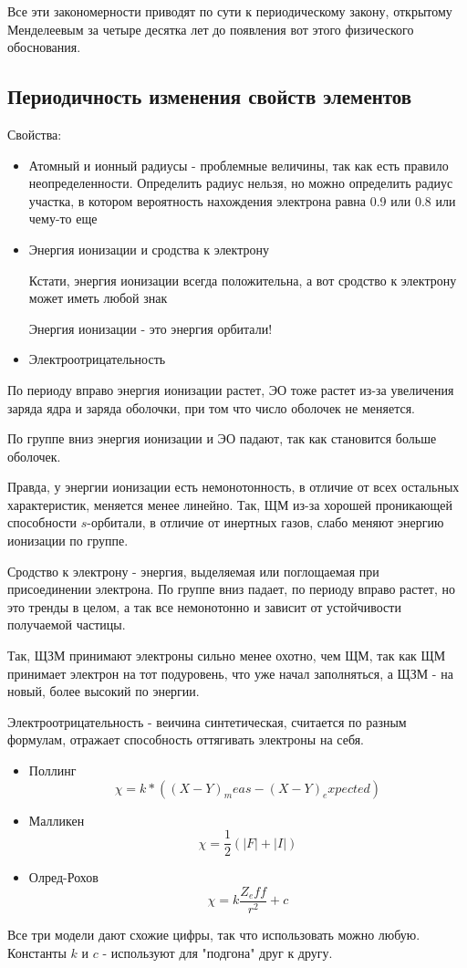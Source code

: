 \documentclass[11pt]{article}
\begin{document}
Все эти закономерности приводят по сути к периодическому закону, открытому Менделеевым за четыре десятка лет до появления вот этого физического обоснования.

\subsection*{Периодичность изменения свойств элементов}
Свойства:
\begin{itemize}
\item Атомный и ионный радиусы - проблемные величины, так как есть правило неопределенности. Определить радиус нельзя, но можно определить радиус участка, в котором вероятность нахождения электрона равна 0.9 или 0.8 или чему-то еще
\item Энергия ионизации и сродства к электрону

Кстати, энергия ионизации всегда положительна, а вот сродство к электрону может иметь любой знак

Энергия ионизации - это энергия орбитали!

\item Электроотрицательность
\end{itemize}

По периоду вправо энергия ионизации растет, ЭО тоже растет из-за увеличения заряда ядра и заряда оболочки, при том что число оболочек не меняется.

По группе вниз энергия ионизации и ЭО падают, так как становится больше оболочек. 

Правда, у энергии ионизации есть немонотонность, в отличие от всех остальных характеристик, меняется менее линейно. Так, ЩМ из-за хорошей проникающей способности $s$-орбитали, в отличие от инертных газов, слабо меняют энергию ионизации по группе.

Сродство к электрону - энергия, выделяемая или поглощаемая при присоединении электрона. По группе вниз падает, по периоду вправо растет, но это тренды в целом, а так все немонотонно и зависит от устойчивости получаемой частицы.

Так, ЩЗМ принимают электроны сильно менее охотно, чем ЩМ, так как ЩМ принимает электрон на тот подуровень, что уже начал заполняться, а ЩЗМ - на новый, более высокий по энергии.

Электроотрицательность - веичина синтетическая, считается по разным формулам, отражает способность оттягивать электроны на себя.
\begin{itemize}
\item Поллинг
$$\chi = k*(\left(X-Y\right)_meas - \left(X-Y\right)_expected)$$
\item Малликен
$$\chi = \frac 12 \left(|F| + |I|\right)$$
\item Олред-Рохов
$$\chi = k\frac{Z_eff}{r^2} + c$$
\end{itemize}
Все три модели дают схожие цифры, так что использовать можно любую. Константы $k$ и $c$ - используют для "подгона" друг к другу.
\end{document}
